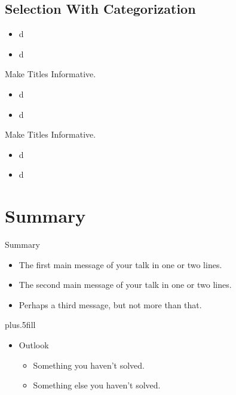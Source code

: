 \documentclass{beamer}
\begin{document}
\subsection{Selection With Categorization}


\begin{frame}{}
    \begin{itemize}
    \item
       d
    \item
        d
    \end{itemize}
\end{frame}

\begin{frame}{Make Titles Informative.}
    \begin{itemize}
    \item
       d
    \item
        d
    \end{itemize}
\end{frame}

\begin{frame}{Make Titles Informative.}
    \begin{itemize}
    \item
       d
    \item
        d
    \end{itemize}
\end{frame}



\section*{Summary}

\begin{frame}{Summary}
  \begin{itemize}
  \item
    The \alert{first main message} of your talk in one or two lines.
  \item
    The \alert{second main message} of your talk in one or two lines.
  \item
    Perhaps a \alert{third message}, but not more than that.
  \end{itemize}
  \vskip0pt plus.5fill
  \begin{itemize}
  \item
    Outlook
    \begin{itemize}
    \item
      Something you haven't solved.
    \item
      Something else you haven't solved.
    \end{itemize}
  \end{itemize}
\end{frame}
\end{document}
